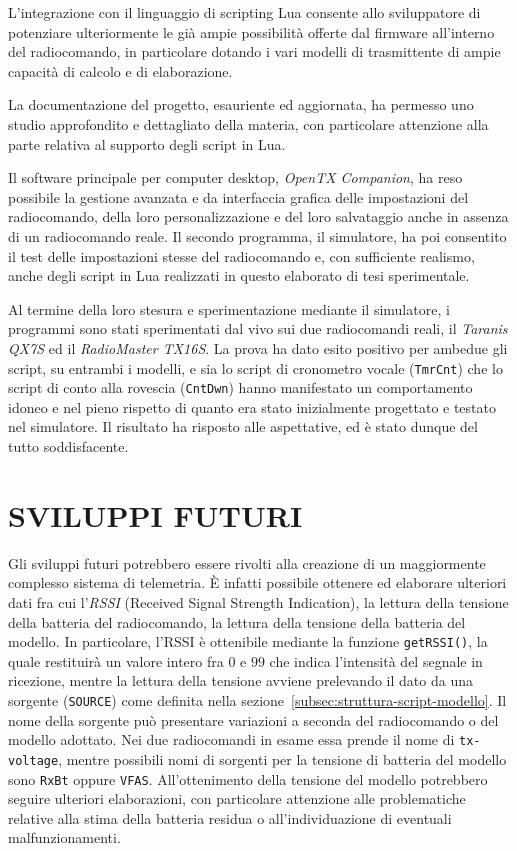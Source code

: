 \documentclass[a4paper, 12pt]{report} %
\begin{document}
L'integrazione con il linguaggio di scripting Lua consente allo sviluppatore di potenziare ulteriormente le già ampie possibilità offerte dal firmware all'interno del radiocomando, in particolare dotando i vari modelli di trasmittente di ampie capacità di calcolo e di elaborazione.

La documentazione del progetto, esauriente ed aggiornata, ha permesso uno studio approfondito e dettagliato della materia, con particolare attenzione alla parte relativa al supporto degli script in Lua.

Il software principale per computer desktop, \emph{OpenTX Companion}, ha reso possibile la gestione avanzata e da interfaccia grafica delle impostazioni del radiocomando, della loro personalizzazione e del loro salvataggio anche in assenza di un radiocomando reale. Il secondo programma, il simulatore, ha poi consentito il test delle impostazioni stesse del radiocomando e, con sufficiente realismo, anche degli script in Lua realizzati in questo elaborato di tesi sperimentale.

Al termine della loro stesura e sperimentazione mediante il simulatore, i programmi sono stati sperimentati dal vivo sui due radiocomandi reali, il \emph{Taranis QX7S} ed il \emph{RadioMaster TX16S}. La prova ha dato esito positivo per ambedue gli script, su entrambi i modelli, e sia lo script di cronometro vocale (\texttt{TmrCnt}) che lo script di conto alla rovescia (\texttt{CntDwn}) hanno manifestato un comportamento idoneo e nel pieno rispetto di quanto era stato inizialmente progettato e testato nel simulatore. Il risultato ha risposto alle aspettative, ed è stato dunque del tutto soddisfacente.


\chapter{SVILUPPI FUTURI}

Gli sviluppi futuri potrebbero essere rivolti alla creazione di un maggiormente complesso sistema di telemetria. È infatti possibile ottenere ed elaborare ulteriori dati fra cui l'\emph{RSSI} (Received Signal Strength Indication), la lettura della tensione della batteria del radiocomando, la lettura della tensione della batteria del modello. In particolare, l'RSSI è ottenibile mediante la funzione \texttt{getRSSI()}, la quale restituirà un valore intero fra $0$ e $99$ che indica l'intensità del segnale in ricezione, mentre la lettura della tensione avviene prelevando il dato da una sorgente (\texttt{SOURCE}) come definita nella sezione~\ref{subsec:struttura-script-modello}. Il nome della sorgente può presentare variazioni a seconda del radiocomando o del modello adottato. Nei due radiocomandi in esame essa prende il nome di \texttt{tx-voltage}, mentre possibili nomi di sorgenti per la tensione di batteria del modello sono \texttt{RxBt} oppure \texttt{VFAS}. All'ottenimento della tensione del modello potrebbero seguire ulteriori elaborazioni, con particolare attenzione alle problematiche relative alla stima della batteria residua o all'individuazione di eventuali malfunzionamenti. 
\end{document}
